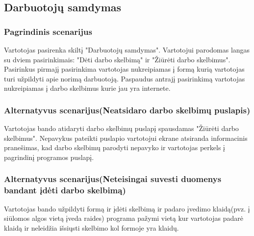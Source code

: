 \documentclass[oneside]{VUMIFPSkursinis}
\begin{document}
\subsection{Darbuotojų samdymas}
	\subsubsection{Pagrindinis scenarijus}
	Vartotojas pasirenka skiltį "Darbuotojų samdymas". Vartotojui parodomas langas su dviem pasirinkimais: "Dėti darbo skelbimą" ir "Žiūrėti darbo skelbimus". Pasirinkus pirmajį pasirinkima vartotojas nukreipiamas į formą kurią vartotojas turi užpildyti apie norimą darbuotoją. Paspaudus antrajį pasirinkimą vartotojas nukreipiamas į darbo skelbimus kurie jau yra internete.
	\subsubsection{Alternatyvus scenarijus(Neatsidaro darbo skelbimų puslapis)}
	Vartotojas bando atidaryti darbo skelbimų puslapį spausdamas "Žiūrėti darbo skelbimus". Nepavykus pateikti puslapio vartotojui ekrane atsiranda informacinis pranešimas, kad darbo skelbimų parodyti nepavyko ir vartotojas perkels į pagrindinį programos puslapį.
	\subsubsection{Alternatyvus scenarijus(Neteisingai suvesti duomenys bandant įdėti darbo skelbimą)}
	Vartotojas bando užpildyti formą ir įdėti skelbimą ir padaro įvedimo klaidą(pvz. į siūlomos algos vietą įveda raides) programa pažymi vietą kur vartotojas padarė klaidą ir neleidžia išsiųsti skelbimo kol formoje yra klaidų.
\end{document}
